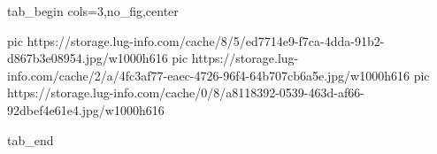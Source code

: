  
 
 
 
 


\ifcmt
  tab_begin cols=3,no_fig,center

     pic https://storage.lug-info.com/cache/8/5/ed7714e9-f7ca-4dda-91b2-d867b3e08954.jpg/w1000h616
		 pic https://storage.lug-info.com/cache/2/a/4fc3af77-eaec-4726-96f4-64b707cb6a5e.jpg/w1000h616
		 pic https://storage.lug-info.com/cache/0/8/a8118392-0539-463d-af66-92dbef4e61e4.jpg/w1000h616

  tab_end
\fi
